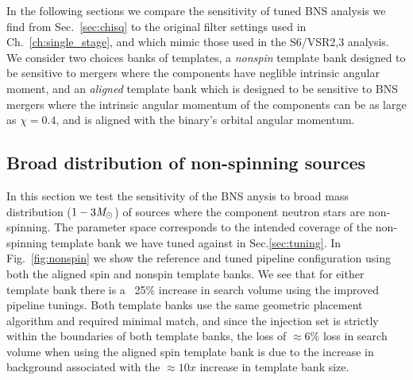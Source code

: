 In the following sections we compare the sensitivity of tuned BNS analysis we find from Sec.~\ref{sec:chisq} to the original filter settings used in Ch.~\ref{ch:single_stage}, and which mimic those used in the S6/VSR2,3 analysis. We consider two choices banks of templates, a \emph{nonspin} template bank designed to be sensitive to mergers where the components have neglible intrinsic angular moment, and an \emph{aligned} template bank which is designed to be sensitive to BNS mergers where the intrinsic angular momentum of the components can be as large as $\chi=0.4$, and is aligned with the binary's orbital angular momentum.

\subsection{Broad distribution of non-spinning sources}

In this section we test the sensitivity of the BNS anysis to broad mass distribution ($1-3 \mathit{M}_\odot$) of sources where the component neutron stars are non-spinning. The parameter space corresponds to the intended coverage of the non-spinning template bank we have tuned against in Sec.\ref{sec:tuning}.  In Fig.~\ref{fig:nonspin} we show the reference and tuned pipeline configuration using both the aligned spin and nonspin template banks. We see that for either template bank there is a ~25$\%$ increase in search volume using the improved pipeline tunings. Both template banks use the same geometric placement algorithm and required minimal match, and since the injection set is strictly within the boundaries of both template banks, the loss of $\approx 6\%$ loss in search volume when using the aligned spin template bank is due to the increase in background associated with the $\approx 10x$ increase in template bank size.


